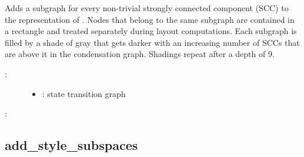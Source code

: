 \documentclass[letterpaper,10pt,english]{sphinxmanual}
\begin{document}
\begin{fulllineitems}
\label{\detokenize{StateTransitionGraphs:PyBoolNet.StateTransitionGraphs.add_style_sccs}}
Adds a subgraph for every non-trivial strongly connected component (SCC) to the  representation of .
Nodes that belong to the same  subgraph are contained in a rectangle and treated separately during layout computations.
Each subgraph is filled by a shade of gray that gets darker with an increasing number of SCCs that are above it in the condensation graph.
Shadings repeat after a depth of 9.
\begin{description}
\item[{:}] \leavevmode\begin{itemize}
\item {} 
: state transition graph

\end{itemize}

\end{description}

:

\begin{sphinxVerbatim}[commandchars=\\\{\}]
\end{sphinxVerbatim}

\end{fulllineitems}



\subsection{add\_style\_subspaces}
\label{\detokenize{StateTransitionGraphs:add-style-subspaces}}\label{\detokenize{StateTransitionGraphs:id23}}
\end{document}
